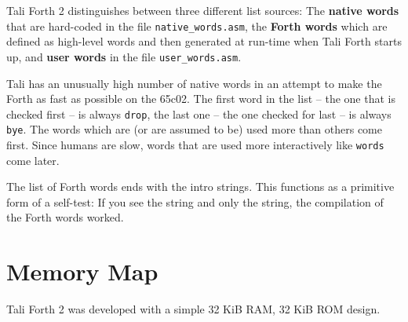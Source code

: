 Tali Forth 2 distinguishes between three different list sources: The
\textbf{native words} that are hard-coded in the file
\texttt{native\_words.asm}, the \textbf{Forth words} which
are defined as high-level words and then generated at run-time when Tali Forth
starts up, and \textbf{user words} in the file
\texttt{user\_words.asm}. 

Tali has an unusually high number of native words in an attempt to make the
Forth as fast as possible on the 65c02. The first word in the list
-- the one that is checked first -- is always
\texttt{drop}, the last one -- the one checked for
last -- is always \texttt{bye}. The words which are (or
are assumed to be) used more than others come first. Since humans are slow,
words that are used more interactively like
\texttt{words} come later. 

The list of Forth words ends with the intro strings. This
functions as a primitive form of a self-test: If you see the
string and only the string, the compilation of the Forth words worked.

\pagebreak

\section{Memory Map}

Tali Forth 2 was developed with a simple 32 KiB RAM, 32 KiB
ROM design. 

